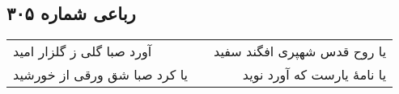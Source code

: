 \begin{center}
\section*{رباعی شماره ۳۰۵}
\label{sec:sh305}
\begin{longtable}{l p{0.5cm} r}
آورد صبا گلی ز گلزار امید
&&
یا روح قدس شهپری افگند سفید
\\
یا کرد صبا شق ورقی از خورشید
&&
یا نامهٔ یارست که آورد نوید
\\
\end{longtable}
\end{center}
